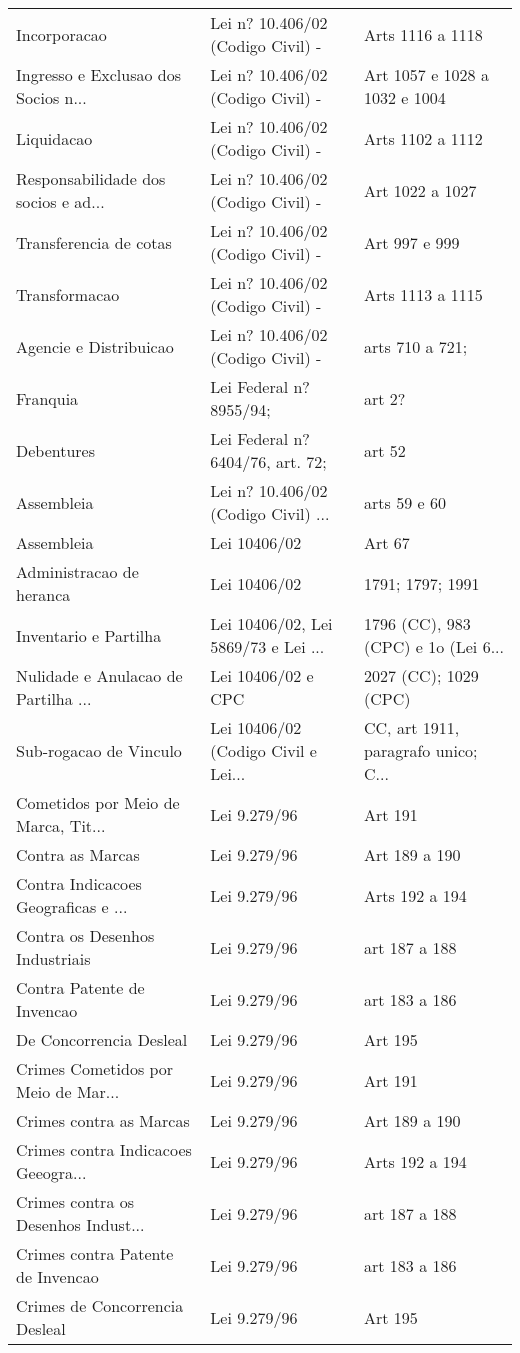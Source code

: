 \documentclass[]{book}
\begin{document}
\begin{longtable}[t]{lll}
Incorporacao & Lei n? 10.406/02 (Codigo Civil) - & Arts 1116 a 1118\\
Ingresso e Exclusao dos Socios n... & Lei n? 10.406/02 (Codigo Civil) - & Art 1057 e 1028 a 1032 e 1004\\
Liquidacao & Lei n? 10.406/02 (Codigo Civil) - & Arts 1102 a 1112\\
\addlinespace
Responsabilidade dos socios e ad... & Lei n? 10.406/02 (Codigo Civil) - & Art 1022 a 1027\\
Transferencia de cotas & Lei n? 10.406/02 (Codigo Civil) - & Art 997 e 999\\
Transformacao & Lei n? 10.406/02 (Codigo Civil) - & Arts 1113 a 1115\\
Agencie e Distribuicao & Lei n? 10.406/02 (Codigo Civil) - & arts 710 a 721;\\
Franquia & Lei Federal n? 8955/94; & art 2?\\
\addlinespace
Debentures & Lei Federal n? 6404/76, art. 72; & art 52\\
Assembleia & Lei n? 10.406/02 (Codigo Civil) ... & arts 59 e 60\\
Assembleia & Lei 10406/02 & Art 67\\
Administracao de heranca & Lei 10406/02 & 1791; 1797; 1991\\
Inventario e Partilha & Lei 10406/02, Lei 5869/73 e Lei ... & 1796 (CC), 983 (CPC) e 1o (Lei 6...\\
\addlinespace
Nulidade e Anulacao de Partilha ... & Lei 10406/02 e CPC & 2027 (CC); 1029 (CPC)\\
Sub-rogacao de Vinculo & Lei 10406/02 (Codigo Civil e Lei... & CC, art 1911, paragrafo unico; C...\\
Cometidos por Meio de Marca, Tit... & Lei 9.279/96 & Art 191\\
Contra as Marcas & Lei 9.279/96 & Art 189 a 190\\
Contra Indicacoes Geograficas e ... & Lei 9.279/96 & Arts 192 a 194\\
\addlinespace
Contra os Desenhos Industriais & Lei 9.279/96 & art 187 a 188\\
Contra Patente de Invencao & Lei 9.279/96 & art 183 a 186\\
De Concorrencia Desleal & Lei 9.279/96 & Art 195\\
Crimes Cometidos por Meio de Mar... & Lei 9.279/96 & Art 191\\
Crimes contra as Marcas & Lei 9.279/96 & Art 189 a 190\\
\addlinespace
Crimes contra Indicacoes Geeogra... & Lei 9.279/96 & Arts 192 a 194\\
Crimes contra os Desenhos Indust... & Lei 9.279/96 & art 187 a 188\\
Crimes contra Patente de Invencao & Lei 9.279/96 & art 183 a 186\\
Crimes de Concorrencia Desleal & Lei 9.279/96 & Art 195\\
\bottomrule
\end{longtable}
\end{document}
